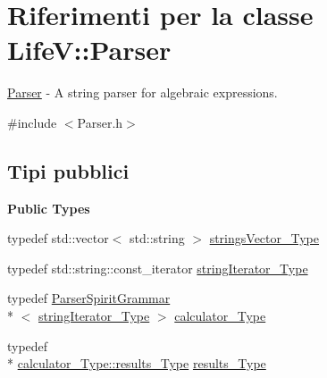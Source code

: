 \hypertarget{classLifeV_1_1Parser}{\section{Riferimenti per la classe Life\-V\-:\-:Parser}
\label{classLifeV_1_1Parser}
}


\hyperlink{classLifeV_1_1Parser}{Parser} -\/ A string parser for algebraic expressions.  




{\ttfamily \#include $<$Parser.\-h$>$}

\subsection*{Tipi pubblici}
\begin{Indent}{\bf Public Types}\par
\begin{DoxyCompactItemize}
\item 
typedef std\-::vector$<$ std\-::string $>$ \hyperlink{classLifeV_1_1Parser_af87d4a11879da16a0bba7bf81f98b957}{strings\-Vector\-\_\-\-Type}
\item 
typedef std\-::string\-::const\-\_\-iterator \hyperlink{classLifeV_1_1Parser_a9491c77a9093b41468ca54b865c893ff}{string\-Iterator\-\_\-\-Type}
\item 
typedef \hyperlink{classLifeV_1_1ParserSpiritGrammar}{Parser\-Spirit\-Grammar}\\*
$<$ \hyperlink{classLifeV_1_1Parser_a9491c77a9093b41468ca54b865c893ff}{string\-Iterator\-\_\-\-Type} $>$ \hyperlink{classLifeV_1_1Parser_ae9a67e24d777a1f962026f5e1274b61a}{calculator\-\_\-\-Type}
\item 
typedef \\*
\hyperlink{classLifeV_1_1ParserSpiritGrammar_a98dabec1a4a9a743a1d3b35e994cec7c}{calculator\-\_\-\-Type\-::results\-\_\-\-Type} \hyperlink{classLifeV_1_1Parser_a9e5861cc337d7534e8641b1709d193db}{results\-\_\-\-Type}
\end{DoxyCompactItemize}
\end{Indent}
